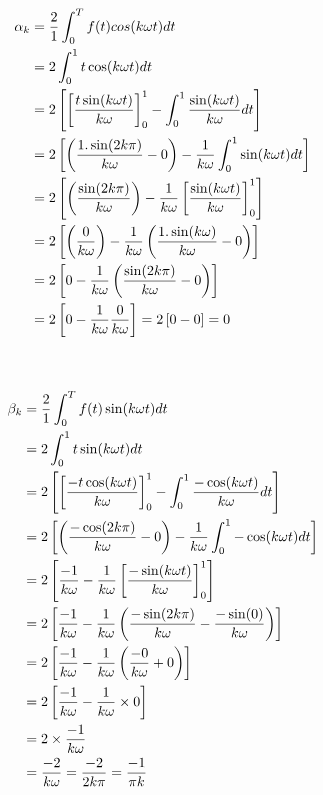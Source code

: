 \documentclass{article}
\begin{document}
\begin{equation}
\begin{split}
\alpha_k & = \frac{2}{1}\int_{0}^{T}f(t)cos(k\omega t)dt\\
& = 2\int_{0}^{1}t\cos(k\omega t)dt\\
& = 2\left[\left[\frac{t\sin(k\omega t)}{k\omega}\right]^1_0 - \int_{0}^{1}\frac{\sin(k\omega t)}{k\omega}dt\right]\\
& = 2\left[\left(\frac{1.\sin(2k\pi)}{k\omega}-0\right) - \frac{1}{k\omega}\int_{0}^{1}\sin(k\omega t)dt\right]\\
& = 2\left[\left(\frac{\sin(2k\pi)}{k\omega}\right) - \frac{1}{k\omega}\left[\frac{\sin(k\omega t)}{k\omega}\right]^1_0\right]\\
& = 2\left[\left(\frac{0}{k\omega}\right) - \frac{1}{k\omega}\left(\frac{1.\sin(k\omega )}{k\omega}-0\right)\right]\\
& = 2\left[0-\frac{1}{k\omega}\left(\frac{\sin(2k\pi)}{k\omega}-0\right)\right]\\
& = 2\left[0-\frac{1}{k\omega}\frac{0}{k\omega}\right]=2\left[0-0\right]=0\\\\\notag
\end{split}
\end{equation}
\begin{equation}
\begin{split}
\beta_k & = \frac{2}{1}\int_{0}^{T}f(t)\sin(k\omega t)dt\\
& = 2\int_{0}^{1}t\sin(k\omega t)dt\\
& = 2\left[\left[\frac{-t\cos(k\omega t)}{k\omega}\right]^1_0 - \int_{0}^{1}\frac{-\cos(k\omega t)}{k\omega}dt\right]\\
& =2\left[\left(\frac{-\cos(2k\pi)}{k\omega}-0\right) - \frac{1}{k\omega}\int_{0}^{1}-\cos(k\omega t)dt\right]\\
& = 2\left[\frac{-1}{k\omega} - \frac{1}{k\omega}\left[\frac{-\sin(k\omega t)}{k\omega}\right]^1_0\right]\\
& =2\left[\frac{-1}{k\omega} - \frac{1}{k\omega}\left(\frac{-\sin(2k\pi)}{k\omega}-\frac{-\sin(0)}{k\omega}\right)\right]\\
& = 2\left[\frac{-1}{k\omega} - \frac{1}{k\omega}\left(\frac{-0}{k\omega}+0\right)\right]\\
& = 2\left[\frac{-1}{k\omega} - \frac{1}{k\omega}\times0\right]\\
& = 2\times\frac{-1}{k\omega}\\
& = \frac{-2}{k\omega} = \frac{-2}{2k\pi}=\frac{-1}{\pi k}\notag
\end{split}
\end{equation}\\\\
\end{document}
